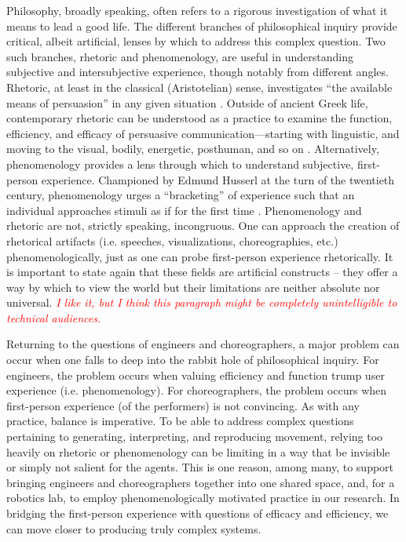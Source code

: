 \documentclass[arts,article,submit,moreauthors,pdftex,10pt,a4paper]{mdpi}
\begin{document}
Philosophy, broadly speaking, often refers to a rigorous investigation of what it means to lead a good life. The different branches of philosophical inquiry provide critical, albeit artificial, lenses by which to address this complex question. Two such branches, rhetoric and phenomenology, are useful in understanding subjective and intersubjective experience, though notably from different angles. Rhetoric, at least in the classical (Aristotelian) sense, investigates ``the available means of persuasion'' in any given situation \cite{kennedy2006rhetoric}. Outside of ancient Greek life, contemporary rhetoric can be understood as a practice to examine the function, efficiency, and efficacy of persuasive communication—starting with linguistic, and moving to the visual, bodily, energetic, posthuman, and so on \cite{barnett2016rhetoric}. Alternatively, phenomenology provides a lens through which to understand subjective, first-person experience. Championed by Edmund Husserl at the turn of the twentieth century, phenomenology urges a ``bracketing'' of experience such that an individual approaches stimuli as if for the first time \cite{husserl2012ideas}. Phenomenology and rhetoric are not, strictly speaking, incongruous. One can approach the creation of rhetorical artifacts (i.e. speeches, visualizations, choreographies, etc.) phenomenologically, just as one can probe first-person experience rhetorically. It is important to state again that these fields are artificial constructs -- they offer a way by which to view the world but their limitations are neither absolute nor universal.   \textcolor{red}{\textit{I like it, but I think this paragraph might be completely unintelligible to technical audiences.}}

Returning to the questions of engineers and choreographers, a major problem can occur when one falls to deep into the rabbit hole of philosophical inquiry. For engineers, the problem occurs when valuing efficiency and function trump user experience (i.e. phenomenology). For choreographers, the problem occurs when first-person experience (of the performers) is not convincing. As with any practice, balance is imperative. To be able to address complex questions pertaining to generating, interpreting, and reproducing movement, relying too heavily on rhetoric or phenomenology can be limiting in a way that be invisible or simply not salient for the agents. This is one reason, among many, to support bringing engineers and choreographers together into one shared space, and, for a robotics lab, to employ phenomenologically motivated practice in our research. In bridging the first-person experience with questions of efficacy and efficiency, we can move closer to producing truly complex systems. 
\end{document}
